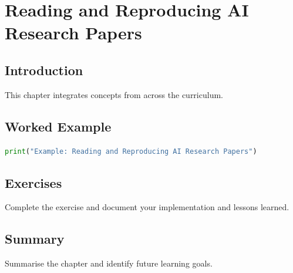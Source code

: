 \chapter{Reading and Reproducing AI Research Papers}
\label{chap:vol11-9}



\section{Introduction}
This chapter integrates concepts from across the curriculum.

\section{Worked Example}
\begin{lstlisting}[language=Python]
print("Example: Reading and Reproducing AI Research Papers")
\end{lstlisting}

\section{Exercises}
\begin{exercise}
Complete the exercise and document your implementation and lessons learned.
\end{exercise}

\section{Summary}
Summarise the chapter and identify future learning goals.
